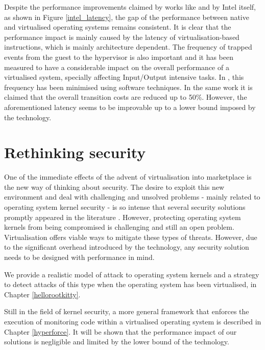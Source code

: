 Despite the performance improvements claimed by works like \cite{rearch, avoidvmexit} and by Intel itself, as shown in Figure \ref{intel_latency}, the gap of the performance between native and virtualised operating systems remains consistent.  
It is clear that the performance impact is mainly caused by the latency of virtualisation-based instructions, which is mainly architecture dependent. The frequency of trapped events from the guest to the hypervisor is also important and it has been measured to have a considerable impact on the overall performance of a virtualised system, specially affecting Input/Output intensive tasks. In \cite{avoidvmexit}, this frequency has been minimised using software techniques. In the same work it is claimed that the overall transition costs are reduced up to 50\%. However, the aforementioned latency seems to be improvable up to a lower bound imposed by the technology. %


\section{Rethinking security} \label{rethinking}
One of the immediate effects of the advent of virtualisation into marketplace is the new way of thinking about security. The desire to exploit this new environment and deal with challenging and unsolved problems - mainly related to operating system kernel security - is so intense that several security solutions promptly appeared in the literature \cite{9, hvmharvard, NICKLE, dynamicdatakernel}.      
However, protecting operating system kernels from being compromised is challenging and still an open problem. 
Virtualisation offers viable ways to mitigate these types of threats. However, due to the significant overhead introduced by the technology, any security solution needs to be designed with performance in mind.

We provide a realistic model of attack to operating system kernels and a strategy to detect attacks of this type when the operating system has been virtualised, in Chapter \ref{hellorootkitty}. 

Still in the field of kernel security, a more general framework that enforces the execution of monitoring code within a virtualised operating system is described in Chapter \ref{hyperforce}. 
It will be shown that the performance impact of our solutions is negligible and limited by the lower bound of the technology.

